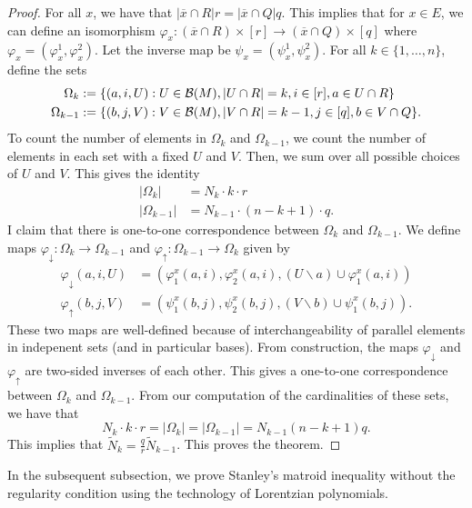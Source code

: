 \documentclass{puthesis-UG}
\begin{document}
\begin{proof}
	For all $x$, we have that $| \overline{x} \cap R| r = |\overline{x} \cap Q| q$. This implies that for $x \in E$, we can define an isomorphism $\varphi_x : (\overline{x} \cap R) \times [r] \to (\overline{x} \cap Q) \times [q]$ where $\varphi_x = \left(\varphi_x^1, \varphi_x^2\right)$. Let the inverse map be $\psi_x = (\psi_x^1, \psi_x^2)$. For all $k \in \{1, \ldots, n\}$, define the sets
	\begin{align*}
		\Omega_k & := \{(a, i, U) : U \in \mathcal{B}(M), |U \cap R| = k, i \in [r], a \in U \cap R\} \\
		\Omega_{k-1} & := \{(b, j, V) : V \in \mathcal{B}(M), |V \cap R| = k-1, j \in [q], b \in V \cap Q\}.
	\end{align*}
	To count the number of elements in $\Omega_k$ and $\Omega_{k-1}$, we count the number of elements in each set with a fixed $U$ and $V$. Then, we sum over all possible choices of $U$ and $V$. This gives the identity
	\begin{align*}
		|\Omega_k| & = N_k \cdot k \cdot r \\
		|\Omega_{k-1}| & = N_{k-1} \cdot (n-k+1) \cdot q.
	\end{align*}
	I claim that there is one-to-one correspondence between $\Omega_k$ and $\Omega_{k-1}$. We define maps $\varphi_{\downarrow} : \Omega_k \to \Omega_{k-1}$ and $\varphi_{\uparrow} : \Omega_{k-1} \to \Omega_k$ given by 
	\begin{align*}
		\varphi_{\downarrow}(a, i, U) & = (\varphi_1^x(a, i), \varphi_2^x (a, i) , (U \backslash a) \cup \varphi_1^x (a, i)) \\
		\varphi_{\uparrow} (b, j, V) & = (\psi_1^x(b, j), \psi_2^x(b,j), (V \backslash b) \cup \psi_1^x(b, j)).
	\end{align*}
	These two maps are well-defined because of interchangeability of parallel elements in indepenent sets (and in particular bases). From construction, the maps $\varphi_{\downarrow}$ and $\varphi_{\uparrow}$ are two-sided inverses of each other. This gives a one-to-one correspondence between $\Omega_k$ and $\Omega_{k-1}$. From our computation of the cardinalities of these sets, we have that 
	\[
		N_k \cdot k \cdot r = |\Omega_k| = |\Omega_{k-1}| = N_{k-1} (n-k+1) q.
	\]
	This implies that $\widetilde{N}_k = \frac{q}{r} \widetilde{N}_{k-1}$. This proves the theorem. 
\end{proof}
In the subsequent subsection, we prove Stanley's matroid inequality without the regularity condition using the technology of Lorentzian polynomials. 
\end{document}
